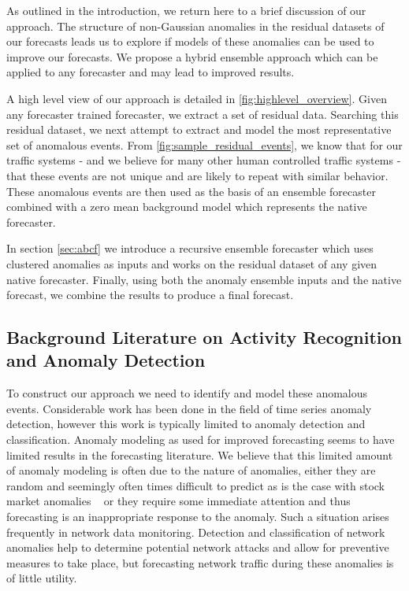 As outlined in the introduction, we return here to a brief discussion of our approach.  The structure of non-Gaussian anomalies in the residual datasets of our forecasts leads us to explore if models of these anomalies can be used to improve our forecasts.  We propose a hybrid ensemble approach which can be applied to any forecaster and may lead to improved results.  

A high level view of our approach is detailed in \ref{fig:highlevel_overview}.  Given any forecaster trained forecaster, we extract a set of residual data.  Searching this residual dataset, we next attempt to extract and model the most representative set of anomalous events.  From \ref{fig:sample_residual_events}, we know that for our traffic systems - and we believe for many other human controlled traffic systems - that these events are not unique and are likely to repeat with similar behavior.  These anomalous events are then used as the basis of an ensemble forecaster combined with a zero mean background model which represents the native forecaster.  

In section \ref{sec:abcf} we introduce a recursive ensemble forecaster which uses clustered anomalies as inputs and works on the residual dataset of any given native forecaster.  Finally, using both the anomaly ensemble inputs and the native forecast, we combine the results to produce a final forecast.  


\subsection{Background Literature on Activity Recognition and Anomaly Detection}
To construct our approach we need to identify and model these anomalous events.  Considerable work has been done in the field of time series anomaly detection, however this work is typically limited to anomaly detection and classification.  Anomaly modeling as used for improved forecasting seems to have limited results in the forecasting literature.  We believe that this limited amount of anomaly modeling is often due to the nature of anomalies, either they are random and seemingly often times difficult to predict as is the case with stock market anomalies ~\cite{Kontonikas2013, Thushara2014} or they require some immediate attention and thus forecasting is an inappropriate response to the anomaly.  Such a situation arises frequently in network data monitoring.  Detection and classification of network anomalies help to determine potential network attacks \cite{Tartakovsky2013, Gogoi2011} and allow for preventive measures to take place, but forecasting network traffic during these anomalies is of little utility.  
   

